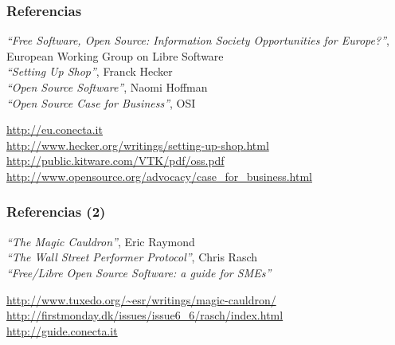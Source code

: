 \begin{frame}
\frametitle{Referencias}

\emph{``Free Software, Open Source: Information Society Opportunities for
Europe?''}, European Working Group on Libre Software \\
\emph{``Setting Up Shop''}, Franck Hecker \\
\emph{``Open Source Software''}, Naomi Hoffman \\
\emph{``Open Source Case for Business''},  OSI \\

\begin{flushright}
{\small
\url{http://eu.conecta.it} \\
\url{http://www.hecker.org/writings/setting-up-shop.html} \\
\url{http://public.kitware.com/VTK/pdf/oss.pdf} \\
\url{http://www.opensource.org/advocacy/case_for_business.html}
}
\end{flushright}

\end{frame}


\begin{frame}
\frametitle{Referencias (2)}

\emph{``The Magic Cauldron''}, Eric Raymond \\
\emph{``The Wall Street Performer Protocol''}, Chris Rasch \\
\emph{``Free/Libre Open Source Software: a guide for SMEs''}

\begin{flushright}
{\small
\url{http://www.tuxedo.org/~esr/writings/magic-cauldron/} \\
\url{http://firstmonday.dk/issues/issue6_6/rasch/index.html} \\
\url{http://guide.conecta.it}
}
\end{flushright}

\end{frame}

